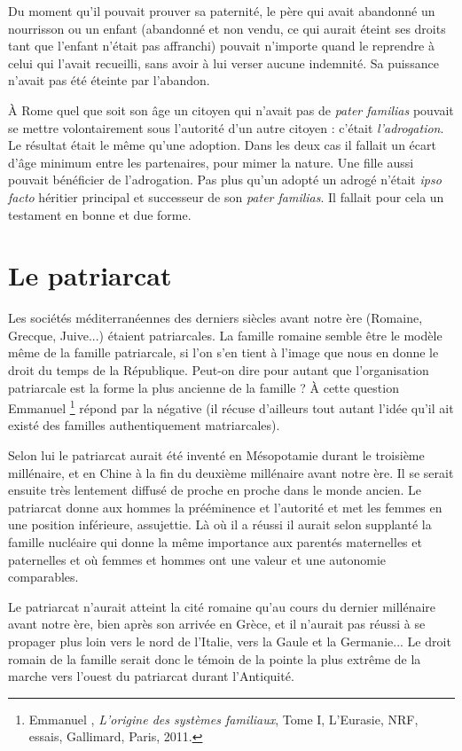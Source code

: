 Du moment qu'il pouvait prouver sa paternité, le père qui avait
abandonné un nourrisson ou un enfant (abandonné et non vendu, ce qui
aurait éteint ses droits tant que l'enfant n'était pas affranchi) pouvait
n'importe quand le reprendre à celui qui l'avait recueilli, sans avoir à lui
verser aucune indemnité. Sa puissance n'avait pas été éteinte par l'abandon.

À Rome quel que soit son âge un citoyen qui n'avait pas de \emph{pater
familias} pouvait se mettre volontairement sous l'autorité d'un autre citoyen :
c'était \emph{l'adrogation}. Le résultat était le même qu'une adoption. Dans
les deux cas il fallait un écart d'âge minimum entre les partenaires, pour
mimer la nature. Une fille aussi pouvait bénéficier de l'adrogation. Pas
plus qu'un adopté un adrogé n'était \emph{ipso facto} héritier principal et successeur
de son \emph{pater familias}. Il fallait pour cela un testament en bonne et
due forme.


\section{Le patriarcat}

Les sociétés méditerranéennes des derniers siècles avant notre ère
(Romaine, Grecque, Juive...) étaient patriarcales. La famille romaine
semble être le modèle même de la famille patriarcale, si l'on s'en tient à
l'image que nous en donne le droit du temps de la République. Peut-on
dire pour autant que l'organisation patriarcale est la forme la plus ancienne
de la famille ? À cette question Emmanuel %
\footnote{Emmanuel , \emph{L'origine des systèmes familiaux}, Tome I, L'Eurasie, NRF,
essais, Gallimard, Paris, 2011.}
répond par
la négative (il récuse d'ailleurs tout autant l'idée qu'il ait existé des familles
authentiquement matriarcales).

Selon lui le patriarcat aurait été inventé en Mésopotamie durant le
troisième millénaire, et en Chine à la fin du deuxième millénaire avant
notre ère. Il se serait ensuite très lentement diffusé de proche en proche
dans le monde ancien. Le patriarcat donne aux hommes la prééminence
et l'autorité et met les femmes en une position inférieure, assujettie. Là
où il a réussi il aurait selon  supplanté la famille nucléaire qui
donne la même importance aux parentés maternelles et paternelles et où
femmes et hommes ont une valeur et une autonomie comparables.

Le patriarcat n'aurait atteint la cité romaine qu'au cours du dernier
millénaire avant notre ère, bien après son arrivée en Grèce, et il n'aurait
pas réussi à se propager plus loin vers le nord de l'Italie, vers la Gaule et
la Germanie... Le droit romain de la famille serait donc le témoin de la
pointe la plus extrême de la marche vers l'ouest du patriarcat durant
l'Antiquité.

